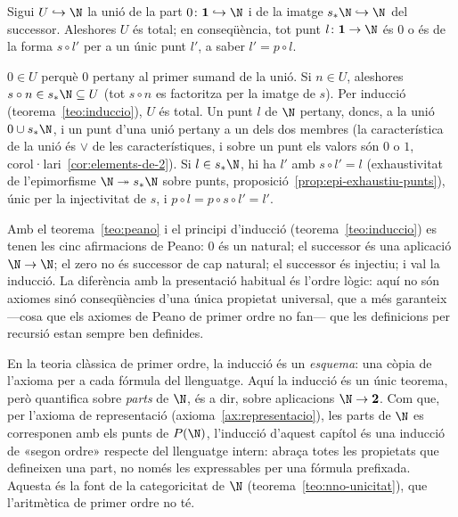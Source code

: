\begin{lema}\label{lema:zero-o-successor}
Sigui \(U\hookrightarrow\N\) la unió de la part \(0\colon\mathbf1\hookrightarrow\N\)
i de la imatge \(s_*\N\hookrightarrow\N\) del successor. Aleshores \(U\) és
total; en conseqüència, tot punt \(l\colon\mathbf1\to\N\) és \(0\) o és de
la forma \(s\circ l'\) per a un únic punt \(l'\), a saber \(l'=p\circ l\).
\end{lema}

\begin{prova}
\(0\in U\) perquè \(0\) pertany al primer sumand de la unió. Si \(n\in U\),
aleshores \(s\circ n\in s_*\N\subseteq U\) (tot \(s\circ n\) es factoritza
per la imatge de \(s\)). Per inducció (teorema~\ref{teo:induccio}), \(U\)
és total. Un punt \(l\) de \(\N\) pertany, doncs, a la unió
\(0\cup s_*\N\), i un punt d'una unió pertany a un dels dos membres
(la característica de la unió és \(\vee\) de les característiques, i
sobre un punt els valors són \(0\) o \(1\), corol·lari~\ref{cor:elements-de-2}).
Si \(l\in s_*\N\), hi ha \(l'\) amb \(s\circ l'=l\) (exhaustivitat de
l'epimorfisme \(\N\twoheadrightarrow s_*\N\) sobre punts,
proposició~\ref{prop:epi-exhaustiu-punts}), únic per la injectivitat de
\(s\), i \(p\circ l=p\circ s\circ l'=l'\).
\end{prova}

\begin{observacio}\label{obs:peano-complet}
Amb el teorema~\ref{teo:peano} i el principi d'inducció
(teorema~\ref{teo:induccio}) es tenen les cinc afirmacions de Peano:
\(0\) és un natural; el successor és una aplicació \(\N\to\N\); el zero no
és successor de cap natural; el successor és injectiu; i val la inducció.
La diferència amb la presentació habitual és l'ordre lògic: aquí no són
axiomes sinó conseqüències d'una única propietat universal, que a més
garanteix ---cosa que els axiomes de Peano de primer ordre no fan--- que
les definicions per recursió estan sempre ben definides.
\end{observacio}

\begin{observacio}\label{obs:induccio-classica}
En la teoria clàssica de primer ordre, la inducció és un \emph{esquema}:
una còpia de l'axioma per a cada fórmula del llenguatge. Aquí la inducció
és un únic teorema, però quantifica sobre \emph{parts} de \(\N\), és a
dir, sobre aplicacions \(\N\to\mathbf2\). Com que, per l'axioma de
representació (axioma~\ref{ax:representacio}), les parts de \(\N\) es
corresponen amb els punts de \(P(\N)\), l'inducció d'aquest capítol és una
inducció de «segon ordre» respecte del llenguatge intern: abraça totes
les propietats que defineixen una part, no només les expressables per una
fórmula prefixada. Aquesta és la font de la categoricitat de \(\N\)
(teorema~\ref{teo:nno-unicitat}), que l'aritmètica de primer ordre no té.
\end{observacio}

